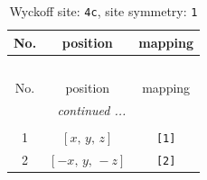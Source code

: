 \documentclass[fleqn,8pt]{jsarticle}
\begin{document}
\begin{longtable}{ccc}
\caption{Wyckoff site: {\tt 4c}, site symmetry: {\tt 1}}
 \\
 \hline \hline
No. & position & mapping \\ \hline \endfirsthead

\multicolumn{2}{l}{\tablename\ \thetable{}} \\
 \hline \hline
No. & position & mapping \\ \hline \endhead

 \hline \hline
\multicolumn{2}{r}{\footnotesize\it continued ...} \\ \endfoot

 \hline \hline
\multicolumn{2}{r}{} \\ \endlastfoot

1 & $\left[ x,\, y,\, z \right]$ & {\tt [1]} \\ \hline
2 & $\left[ - x,\, y,\, - z \right]$ & {\tt [2]} \\
\end{longtable}
\end{document}
